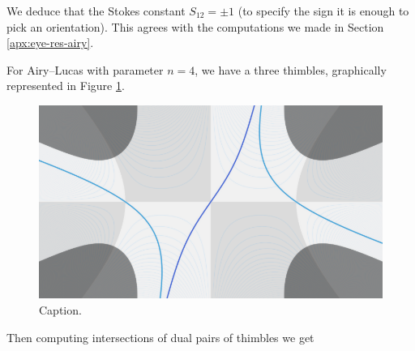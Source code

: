\documentclass{article}
\theoremstyle{definition}
\theoremstyle{plain}
\begin{document}
We deduce that the Stokes constant $S_{12}=\pm 1$ (to specify the sign it is enough to pick an orientation). This agrees with the computations we made in Section \ref{apx:eye-res-airy}.

For Airy--Lucas with parameter $n=4$, we have a three thimbles, graphically represented in Figure \ref{fig:thimble-n4}. 
\begin{figure}[ht]
    \centering
    \includegraphics[scale=0.35]{figures/thimble-n4.png}
    \caption{Caption.}
    \label{fig:thimble-n4}
\end{figure}
Then computing intersections of dual pairs of thimbles we get 
\end{document}
